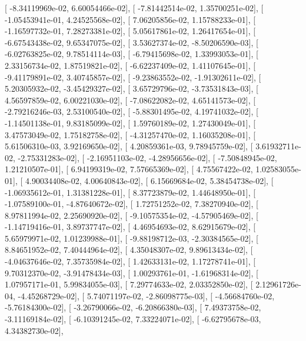 \documentclass{article}
\begin{document}
       [ -8.34119969e-02,   6.60054466e-02],
       [ -7.81442514e-02,   1.35700251e-02],
       [ -1.05453941e-01,   4.24525568e-02],
       [  7.06205856e-02,   1.15788233e-01],
       [ -1.16597732e-01,   7.28273381e-02],
       [  5.05617861e-02,   1.26417654e-01],
       [ -6.67543438e-02,   9.65347075e-02],
       [  3.53627374e-02,  -8.50206590e-03],
       [ -6.02763825e-02,   9.78514114e-03],
       [ -6.79415698e-02,   1.33993053e-01],
       [  2.33156734e-02,   1.87519821e-02],
       [ -6.62237409e-02,   1.41107645e-01],
       [ -9.41179891e-02,   3.40745857e-02],
       [ -9.23863552e-02,  -1.91302611e-02],
       [  5.20305932e-02,  -3.45429327e-02],
       [  3.65729796e-02,  -3.73531843e-03],
       [  4.56597859e-02,   6.00221030e-02],
       [ -7.08622082e-02,   4.65141573e-02],
       [ -2.79216246e-03,   2.53100540e-02],
       [ -5.88301495e-02,   4.19741032e-02],
       [ -1.14501138e-01,   9.83185099e-02],
       [  1.59760189e-02,   1.27430049e-01],
       [  3.47573049e-02,   1.75182758e-02],
       [ -4.31257470e-02,   1.16035208e-01],
       [  5.61506310e-03,   3.92169650e-02],
       [  4.20859361e-03,   9.78945759e-02],
       [  3.61932711e-02,  -2.75331283e-02],
       [ -2.16951103e-02,  -4.28956656e-02],
       [ -7.50848945e-02,   1.21210507e-01],
       [  6.94199319e-02,   7.57665369e-02],
       [  4.75567422e-02,   1.02583055e-01],
       [  4.90034408e-02,   4.00640843e-02],
       [  6.15669684e-02,   5.38454738e-02],
       [ -1.06935612e-01,   1.31381228e-01],
       [  8.37723879e-02,   1.44648950e-01],
       [ -1.07589100e-01,  -4.87640672e-02],
       [  1.72751252e-02,   7.38270940e-02],
       [  8.97811994e-02,   2.25690920e-02],
       [ -9.10575354e-02,  -4.57905469e-02],
       [ -1.14719416e-01,   3.89737747e-02],
       [  4.46954693e-02,   8.62915679e-02],
       [  5.65979971e-02,   1.01239988e-01],
       [ -9.88198712e-03,  -2.30384565e-02],
       [  8.84651952e-02,   7.40444964e-02],
       [  4.35048307e-02,   9.89613434e-02],
       [ -4.04637646e-02,   7.35735984e-02],
       [  1.42633131e-02,   1.17278741e-01],
       [  9.70312370e-02,  -3.91478434e-03],
       [  1.00293761e-01,  -1.61968314e-02],
       [  1.07957171e-01,   5.99834055e-03],
       [  7.29774633e-02,   2.03352850e-02],
       [  2.12961726e-04,  -4.45268729e-02],
       [  5.74071197e-02,  -2.86098775e-03],
       [ -4.56684760e-02,  -5.76184300e-02],
       [ -3.26790066e-02,  -6.20866380e-03],
       [  7.49373758e-02,  -3.11169184e-02],
       [ -6.10391245e-02,   7.33224071e-02],
       [ -6.62795678e-03,   4.34382730e-02],
\end{document}
